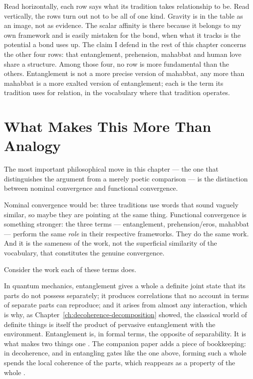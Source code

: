 Read horizontally, each row says what its tradition takes relationship to be. Read vertically, the rows turn out not to be all of one kind. Gravity is in the table as an image, not as evidence. The scalar affinity is there because it belongs to my own framework and is easily mistaken for the bond, when what it tracks is the potential a bond uses up. The claim I defend in the rest of this chapter concerns the other four rows: that entanglement, prehension, mahabbat and human love share a structure. Among those four, no row is more fundamental than the others. Entanglement is not a more precise version of mahabbat, any more than mahabbat is a more exalted version of entanglement; each is the term its tradition uses for relation, in the vocabulary where that tradition operates.


\section{What Makes This More Than Analogy}
\label{sec:ch14-more-than-analogy}

The most important philosophical move in this chapter — the one that distinguishes the argument from a merely poetic comparison — is the distinction between nominal convergence and functional convergence.

Nominal convergence would be: three traditions use words that sound vaguely similar, so maybe they are pointing at the same thing. Functional convergence is something stronger: the three terms — entanglement, prehension/eros, mahabbat — perform the same \emph{role} in their respective frameworks. They do the same work. And it is the sameness of the work, not the superficial similarity of the vocabulary, that constitutes the genuine convergence.

Consider the work each of these terms does.

In quantum mechanics, entanglement gives a whole a definite joint state that its parts do not possess separately; it produces correlations that no account in terms of separate parts can reproduce; and it arises from almost any interaction, which is why, as Chapter~\ref{ch:decoherence-decomposition} showed, the classical world of definite things is itself the product of pervasive entanglement with the environment. Entanglement is, in formal terms, the opposite of separability. It is what makes two things one \citep{Bell1964}. The companion paper adds a piece of bookkeeping: in decoherence, and in entangling gates like the one above, forming such a whole spends the local coherence of the parts, which reappears as a property of the whole \citep{AdamsRCT}.


